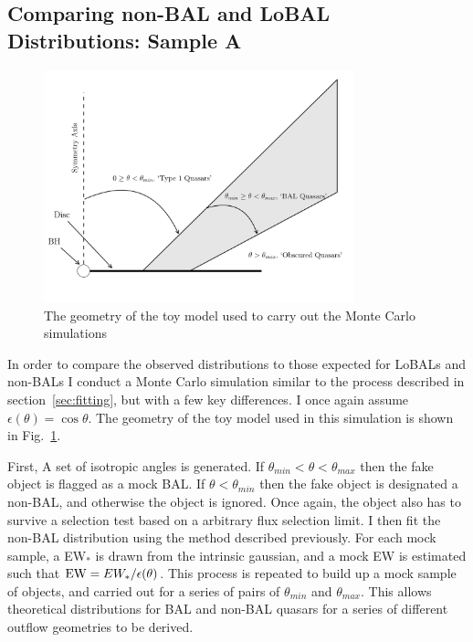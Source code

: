 \subsection{Comparing non-BAL and LoBAL Distributions: Sample A}
\label{sec:bal_v_nonbal}

\begin{figure}
\centering
\includegraphics[width=0.8\textwidth]{figures/ewpaper/fig2_cartoon.png}
\caption
{
The geometry of the toy model used to carry out the Monte Carlo simulations
}
\label{fig:cartoon}
\end{figure}


In order to compare the observed distributions to those expected for LoBALs and
non-BALs I conduct a Monte Carlo simulation similar to
the process described in section~\ref{sec:fitting}, but with a few 
key differences. I once again assume $\epsilon(\theta) = \cos \theta$.
The geometry of the toy model used in this simulation is shown in
Fig.~\ref{fig:cartoon}.

First, A set of isotropic angles is generated.
If $\theta_{min}<\theta<\theta_{max}$ then the fake object 
is flagged as a mock BAL. If $\theta<\theta_{min}$ then the 
fake object is designated a non-BAL, and otherwise
the object is ignored. Once again, the object also has to 
survive a selection test based on a arbitrary flux selection limit.
I then fit the non-BAL distribution using the method described previously.
For each mock sample, a EW$_*$ is drawn from the intrinsic gaussian,
and a mock EW is estimated such that ${\rm EW} = EW_* / \epsilon(\theta)$.
This process is repeated to build up a mock sample of objects, and 
carried out for a series of pairs of $\theta_{min}$ and $\theta_{max}$.
This allows theoretical distributions for BAL and non-BAL quasars
for a series of different outflow geometries to be derived.

